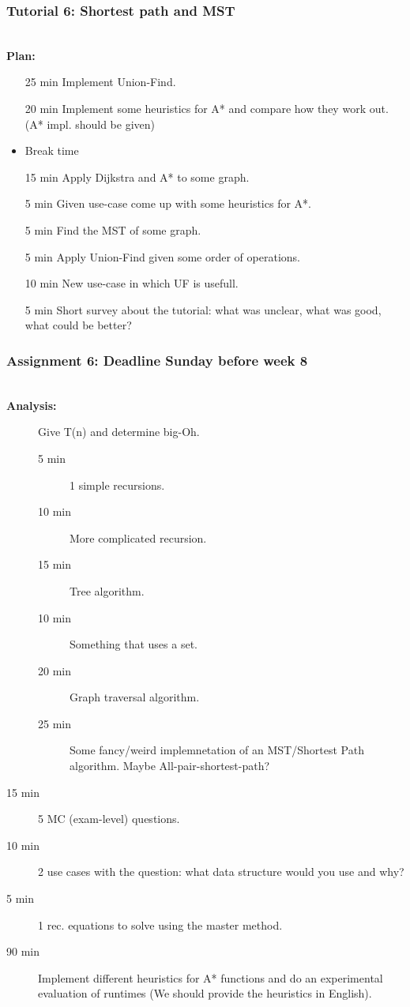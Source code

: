 \newpage
\subsubsection{Tutorial 6: Shortest path and MST}
\label{ssub:tutorial_6}

\hfill\\
\textbf{Plan:}\\
\begin{itemize}
	\item[25 min] Implement Union-Find.
	\item[20 min] Implement some heuristics for A* and compare how they work out. (A* impl. should be given)
	\item Break time
	\item[15 min] Apply Dijkstra and A* to some graph.
	\item[5 min] Given use-case come up with some heuristics for A*.
	\item[5 min] Find the MST of some graph.
	\item[5 min] Apply Union-Find given some order of operations.
	\item[10 min] New use-case in which UF is usefull.
	\item[5 min] Short survey about the tutorial: what was unclear, what was good, what could be better?
\end{itemize}


\newpage
\subsubsection{Assignment 6: Deadline Sunday before week 8}
\label{ssub:assignment_6}

\hfill\\
\textbf{Analysis:}\\
\begin{description}
	\item[] Give T(n) and determine big-Oh. 
		\begin{description}
			\item[5 min] 1 simple recursions.
			\item[10 min] More complicated recursion.
			\item[15 min] Tree algorithm.
			\item[10 min] Something that uses a set.
			\item[20 min] Graph traversal algorithm.
			\item[25 min] Some fancy/weird implemnetation of an MST/Shortest Path algorithm. Maybe All-pair-shortest-path?
		\end{description}
	\item[15 min] 5 MC (exam-level) questions.
	\item[10 min] 2 use cases with the question: what data structure would you use and why?
	\item[5 min] 1 rec. equations to solve using the master method.
	\item[90 min] Implement different heuristics for A* functions and do an experimental evaluation of runtimes (We should
		provide the heuristics in English).
\end{description}

